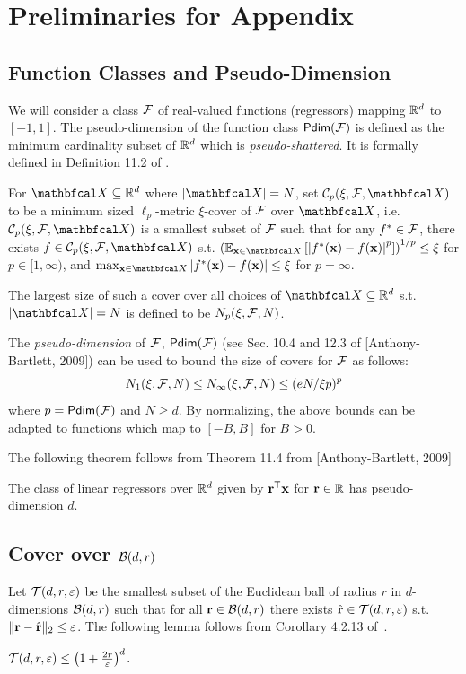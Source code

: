 \section{Preliminaries for Appendix}


\subsection{Function Classes and Pseudo-Dimension} \label{sec:pdim}
 We will consider a class $\mathcal{F}$ of real-valued functions (regressors) mapping $\mathbb{R}^d$ to  $[-1, 1]$. The pseudo-dimension of the function class ${\sf Pdim}(\mathcal{F})$ is defined as the minimum cardinality subset of $\mathbb{R}^{d}$ which is \emph{pseudo-shattered}.  It is formally defined in Definition 11.2 of \citep{anthonybartlett}.

 For $\mbc{X} \subseteq \R^d$ where $|\mbc{X}| = N$, set $\mc{C}_p(\xi, \mc{F}, \mbc{X})$ to be a minimum sized $\ell_p$-metric $\xi$-cover of $\mathcal{F}$ over $\mbc{X}$, i.e. $\mc{C}_p(\xi, \mc{F}, \mbc{X})$ is a smallest subset of $\mathcal{F}$ such that for any $f^* \in \mathcal{F}$, there exists $f \in \mc{C}_p(\xi, \mc{F}, \mbc{X})$ s.t. $\left(\E_{\bx \in \mbc{X}}\left[\left|f^*(\bx) - f(\bx)\right|^p\right]\right)^{1/p} \leq \xi$ for $p \in [1,\infty)$, and $\max_{\bx\in \mbc{X}}\left|f^*(\bx) - f(\bx)\right| \leq \xi$ for $p =\infty$.
 

 The largest size of such a cover over all choices of $\mbc{X} \subseteq \R^d$ s.t. $|\mbc{X}| = N$ is defined to be  $N_p(\xi, \mathcal{F}, N)$.
 
The \emph{pseudo-dimension} of $\mathcal{F}$, ${\sf Pdim}(\mathcal{F})$ (see Sec. 10.4 and 12.3 of [Anthony-Bartlett, 2009]) can be used to bound the size of covers for $\mathcal{F}$ as follows: 
\begin{equation}
    N_1(\xi, \mathcal{F}, N) \leq N_\infty(\xi, \mathcal{F}, N) \leq (eN/\xi p)^p \label{eqn:coversize}
\end{equation}
where $p = {\sf Pdim}(\mathcal{F})$ and $N \geq d$.
By normalizing, the above bounds can be adapted to functions which map to $[-B, B]$ for $B > 0$. 

The following theorem follows from Theorem 11.4 from [Anthony-Bartlett, 2009]
\begin{theorem}\label{thm:Pdim-linear}
The class of linear regressors over $\mathbb{R}^d$ given by ${\mathbf{r}}^{\sf T}{\mathbf{x}}$ for ${\mathbf{r}} \in \mathbb{R}$ has pseudo-dimension $d$.
\end{theorem}

\subsection{Cover over $\mathcal{B}(d, r)$} \label{sec:nets}
Let $\mathcal{T}(d, r, {\varepsilon})$ be the smallest subset of the Euclidean ball of radius $r$ in $d$-dimensions $\mathcal{B}(d, r)$ such that  for all ${\mathbf{r}} \in \mathcal{B}(d, r)$ there exists $\hat{{\mathbf{r}}} \in \mathcal{T}(d, r, {\varepsilon})$ s.t. $\|{\mathbf{r}} - \hat{{\mathbf{r}}}\|_2 \leq {\varepsilon}$. The following lemma follows from  Corollary 4.2.13 of~\citep{HDPbook}.
\begin{lemma}\label{lem:covering_no_ball}
$\mathcal{T}(d, r, {\varepsilon}) \leq \left(1 + \tfrac{2r}{{\varepsilon}}\right)^d$.
\end{lemma}




